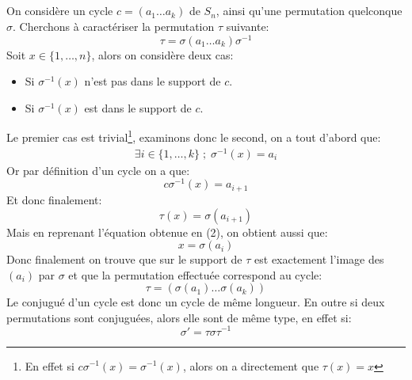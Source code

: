 \documentclass{report}
\begin{document}
      \subsection*{}
         On considère un cycle $c = (a_1 \ldots a_k)$ de $S_n$, ainsi qu'une permutation quelconque $\sigma$. Cherchons à caractériser la permutation $\tau$ suivante:
         $$
            \tau = \sigma (a_1 \ldots a_k) \sigma^{-1}
         $$
         Soit $x \in \{1, \ldots, n\}$, alors on considère deux cas:
         \begin{itemize}
            \item Si $\sigma^{-1}(x)$ n'est pas dans le support de $c$.
            \item Si $\sigma^{-1}(x)$ est dans le support de $c$.
         \end{itemize}
         Le premier cas est trivial\footnote{En effet si $c \sigma^{-1}(x) = \sigma^{-1}(x)$, alors on a directement que $\tau(x) = x$}, examinons donc le second, on a tout d'abord que:
         \begin{align}
               \exists i \in \{1, \ldots, k\} \; ; \; \sigma^{-1}(x) = a_i
         \end{align}
         Or par définition d'un cycle on a que:
         $$
            c\sigma^{-1}(x) = a_{i+1}
         $$
         Et donc finalement:
         $$
            \tau(x) = \sigma(a_{i+1})
         $$
         Mais en reprenant l'équation obtenue en (2), on obtient aussi que:
         $$
            x = \sigma(a_i)
         $$
         Donc finalement on trouve que sur le support de $\tau$ est exactement l'image des $(a_i)$ par $\sigma$ et que la permutation effectuée correspond au cycle:
         $$
            \tau = (\sigma(a_1) \ldots \sigma(a_k))
         $$
         Le conjugué d'un cycle est donc un cycle de même longueur. En outre si deux permutations sont conjuguées, alors elle sont de même type, en effet si:
         \[
            \sigma' = \tau\sigma\tau^{-1}
         \]       
\end{document}
